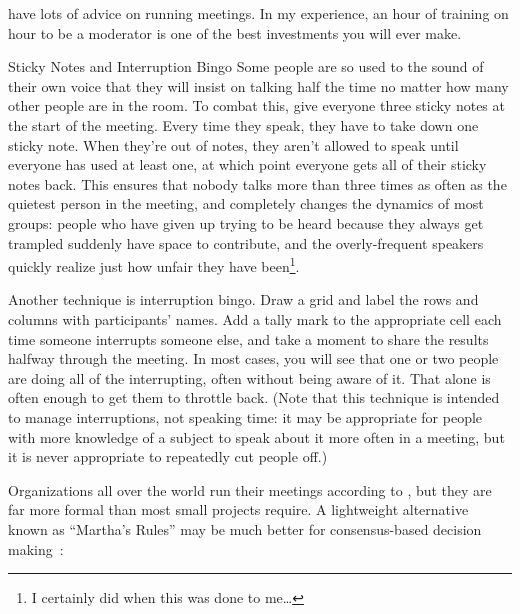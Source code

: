 \cite{Brow2007,Broo2016,Roge2018} have lots of advice on running meetings.
In my experience,
an hour of training on hour to be a moderator
is one of the best investments you will ever make.

\begin{aside}{Sticky Notes and Interruption Bingo}
  Some people are so used to the sound of their own voice
  that they will insist on talking half the time
  no matter how many other people are in the room.
  To combat this,
  give everyone three sticky notes at the start of the meeting.
  Every time they speak,
  they have to take down one sticky note.
  When they're out of notes,
  they aren't allowed to speak until everyone has used at least one,
  at which point everyone gets all of their sticky notes back.
  This ensures that nobody talks more than three times as often as
  the quietest person in the meeting,
  and completely changes the dynamics of most groups:
  people who have given up trying to be heard because they always get trampled
  suddenly have space to contribute,
  and the overly-frequent speakers quickly realize just how unfair they have been\footnote{
    I certainly did when this was done to me{\ldots}
  }.

  Another technique is interruption bingo.
  Draw a grid and label the rows and columns with participants' names.
  Add a tally mark to the appropriate cell
  each time someone interrupts someone else,
  and take a moment to share the results halfway through the meeting.
  In most cases,
  you will see that one or two people are doing all of the interrupting,
  often without being aware of it.
  That alone is often enough to get them to throttle back.
  (Note that this technique is intended to manage interruptions,
  not speaking time:
  it may be appropriate for people with more knowledge of a subject
  to speak about it more often in a meeting,
  but it is never appropriate to repeatedly cut people off.)
\end{aside}


Organizations all over the world run their meetings according to
,
but they are far more formal than most small projects require.
A lightweight alternative known as ``Martha's Rules''
may be much better for consensus-based decision making~\cite{Mina1986}:

